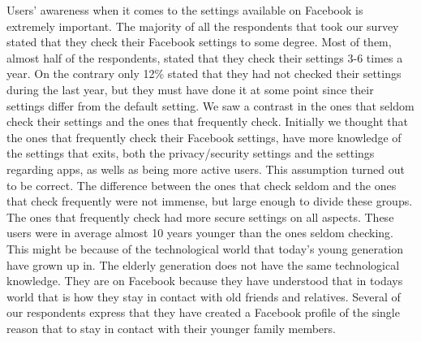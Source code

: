 Users' awareness when it comes to the settings available on Facebook is extremely important. The majority of all the respondents that took our survey stated that they check their Facebook settings to some degree. Most of them, almost half of the respondents,  stated that they check their settings 3-6 times a year. On the contrary only 12\% stated that they had not checked their settings during the last year, but they must have done it at some point since their settings differ from the default setting. We saw a contrast in the ones that seldom check their settings and the ones that frequently check. Initially we 
thought that the ones that frequently check their Facebook settings, have more knowledge of the settings that exits, both the privacy/security settings and the settings regarding apps, as wells as being more active users. This assumption turned out to be correct. The difference between the ones that check seldom and the ones that check frequently were not immense, but large enough to divide these groups. The ones that frequently check had more secure settings on all aspects. These users were in average almost 10 years younger than the ones seldom checking. This might be because of the technological world that today's young generation have grown up in. The elderly generation does not have the same technological knowledge. They are on Facebook because they have understood that in todays world that is how they stay in contact with old friends and relatives. Several of our respondents express that they have created a Facebook profile of the single reason that to stay in contact with their younger family members. 

